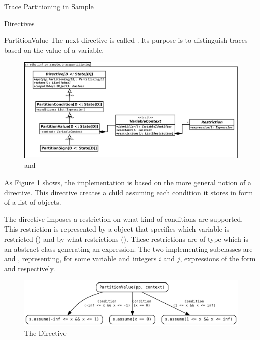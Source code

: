 \begin{chapter}{Trace Partitioning in Sample}
\begin{section}{Directives}

		\begin{subsection}{PartitionValue}
			The next directive is called . Its purpose is to distinguish traces based on the value of a variable.

			\begin{figure}
				\includegraphics[width=\textwidth]{Diagrams/PartitionValue.png}
				\caption{ and }
				\label{figure:PartitionValueArchitecture}
			\end{figure}

			As Figure \ref{figure:PartitionValueArchitecture} shows, the implementation is based on the more general notion of a  directive. This directive creates a child assuming each condition it stores in form of a list of  objects.

			The  directive imposes a restriction on what kind of conditions are supported. This restriction is represented by a  object that specifies which variable is restricted () and by what restrictions (). These restrictions are of type  which is an abstract class generating an expression. The two implementing subclasses are  and , representing, for some variable  and integers $i$ and $j$, expressions of the form  and  respectively. 

			\begin{figure}
				\centering
				\includegraphics[width=\textwidth]{Graphs/PartitionValue.pdf}
				\caption{The  Directive}
				\label{figure:PartitionValue}
			\end{figure}


\end{subsection}
\end{section}
\end{chapter}
